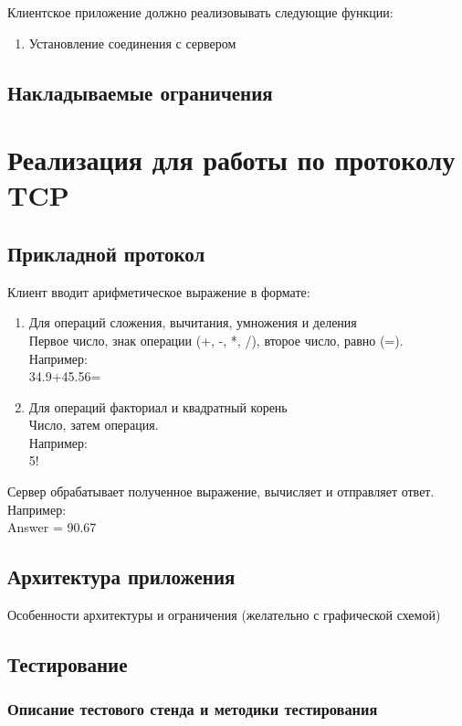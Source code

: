 \documentclass[12pt,a4paper]{report}
\begin{document}
Клиентское приложение должно реализовывать следующие функции:
\begin{enumerate}
\item{Установление соединения с сервером}
\end{enumerate}

\section{Накладываемые ограничения}

\chapter{Реализация для работы по протоколу TCP}
\section{Прикладной протокол}
\label{protocol_tcp}
Клиент вводит арифметическое выражение в формате:
\begin{enumerate}
\item{Для операций сложения, вычитания, умножения и деления }\\
Первое число, знак операции (+, -, *, /), второе число, равно (=).\\
Например: \\
34.9+45.56=
\item{Для операций факториал и квадратный корень} \\
Число, затем операция. \\
Например:\\
5!\\
\end{enumerate}

Сервер обрабатывает полученное выражение, вычисляет и отправляет ответ.\\
Например:\\
Answer = 90.67\\
\section{Архитектура приложения}
Особенности архитектуры и ограничения (желательно с графической схемой) 

\section{Тестирование}
\subsection{Описание тестового стенда и методики тестирования}
\end{document}
